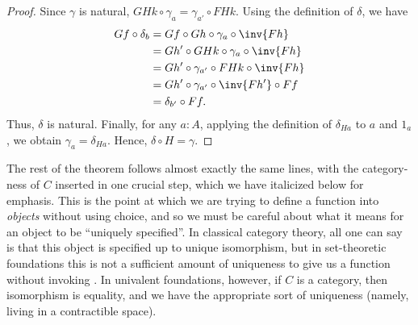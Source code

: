 \begin{proof}
  Since $\gamma$ is natural, $GHk\circ \gamma_a = \gamma_{a'} \circ FHk$.
  Using the definition of $\delta$, we have
  \begin{align*}
    Gf \circ \delta_b
    &= Gf \circ Gh \circ \gamma_a \circ \inv{Fh}\\
    &= Gh' \circ GHk\circ \gamma_a \circ \inv{Fh}\\
    &= Gh' \circ \gamma_{a'} \circ FHk \circ \inv{Fh}\\
    &= Gh' \circ \gamma_{a'} \circ \inv{Fh'} \circ Ff\\
    &= \delta_{b'} \circ Ff.
  \end{align*}
  Thus, $\delta$ is natural.
  Finally, for any $a:A$, applying the definition of $\delta_{Ha}$ to $a$ and $1_a$, we obtain $\gamma_a = \delta_{Ha}$.
  Hence, $\delta \circ H = \gamma$.
\end{proof}

The rest of the theorem follows almost exactly the same lines, with the category-ness of $C$ inserted in one crucial step, which we have italicized below for emphasis.
This is the point at which we are trying to define a function into \emph{objects} without using choice, and so we must be careful about what it means for an object to be ``uniquely specified''.
In classical category theory, all one can say is that this object is specified up to unique isomorphism, but in set-theoretic foundations this is not a sufficient amount of uniqueness to give us a function without invoking \choice{}.
In univalent foundations, however, if $C$ is a category, then isomorphism is equality, and we have the appropriate sort of uniqueness (namely, living in a contractible space).

%

